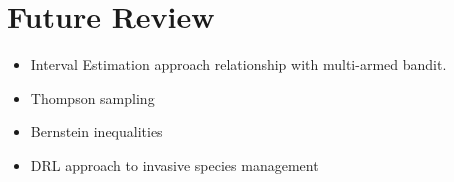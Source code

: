\documentclass[a4paper,12pt]{article}
\begin{document}

\section {Future Review}
\begin{itemize}
    \item Interval Estimation approach relationship with multi-armed bandit.
    \item Thompson sampling
    \item Bernstein inequalities
    \item DRL approach to invasive species management
\end{itemize}








\end{document}
